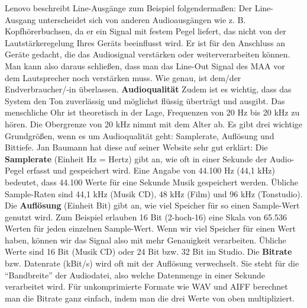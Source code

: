 \documentclass[11pt, twoside]{article}
\begin{document}
Lenovo beschreibt Line-Ausgänge zum Beispiel folgendermaßen: \glqq Der Line-Ausgang unterscheidet sich von anderen Audioausgängen wie z. B. Kopfhörerbuchsen, da er ein Signal mit festem Pegel liefert, das nicht von der Lautstärkeregelung Ihres Geräts beeinflusst wird. Er ist für den Anschluss an Geräte gedacht, die das Audiosignal verstärken oder weiterverarbeiten können.\grqq{} \parencite{noauthor_urlnl02_nodate} \newline
Man kann also daraus schließen, dass man das Line-Out Signal des MAA vor dem Lautsprecher noch verstärken muss. Wie genau, ist dem/der Endverbraucher/-in überlassen. \parencite[vgl.][]{noauthor_urlnl02_nodate}
\vspace{4mm}\newline
\textbf{Audioqualität}\newline
Zudem ist es wichtig, dass das System den Ton zuverlässig und möglichst flüssig überträgt und ausgibt.\newline
\glqq Das menschliche Ohr ist theoretisch in der Lage, Frequenzen von 20 Hz bis 20 kHz zu hören. Die
Obergrenze von 20 kHz nimmt mit dem Alter ab.\grqq{} \parencite{noauthor_urlnl03_nodate} \newline
Es gibt drei wichtige Grundgrößen, wenn es um Audioqualität geht: Samplerate, Auflösung und Bittiefe. Jan Baumann hat diese auf seiner Website sehr gut erklärt:
\vspace{4mm}\newline
\glqq Die \textbf{Samplerate} (Einheit Hz = Hertz) gibt an, wie oft in einer Sekunde der Audio-Pegel erfasst und gespeichert wird. Eine Angabe von 44.100 Hz (44,1 kHz) bedeutet, dass 44.100 Werte für eine Sekunde Musik gespeichert werden. Übliche Sample-Raten sind 44,1 kHz (Musik CD), 48 kHz (Film) und 96 kHz (Tonstudio).\grqq{} \parencite{noauthor_urlnl04_nodate}
\vspace{4mm}\newline
\glqq Die \textbf{Auflösung} (Einheit Bit) gibt an, wie viel Speicher für so einen Sample-Wert genutzt wird. Zum Beispiel erlauben 16 Bit (2-hoch-16) eine Skala von 65.536 Werten für jeden einzelnen Sample-Wert. Wenn wir viel Speicher für einen Wert haben, können wir das Signal also mit mehr Genauigkeit verarbeiten. Übliche Werte sind 16 Bit (Musik CD) oder 24 Bit bzw. 32 Bit im Studio.\grqq{} \parencite{noauthor_urlnl04_nodate}
\vspace{4mm}\newline 
\glqq Die \textbf{Bitrate} bzw. Datenrate (kBit/s) wird oft mit der Auflösung verwechselt. Sie steht für die “Bandbreite” der Audiodatei, also welche Datenmenge in einer Sekunde verarbeitet wird. Für unkomprimierte Formate wie WAV und AIFF berechnet man die Bitrate ganz einfach, indem man die drei Werte von oben multipliziert.\grqq{}\parencite{noauthor_urlnl04_nodate}\newline
\end{document}
